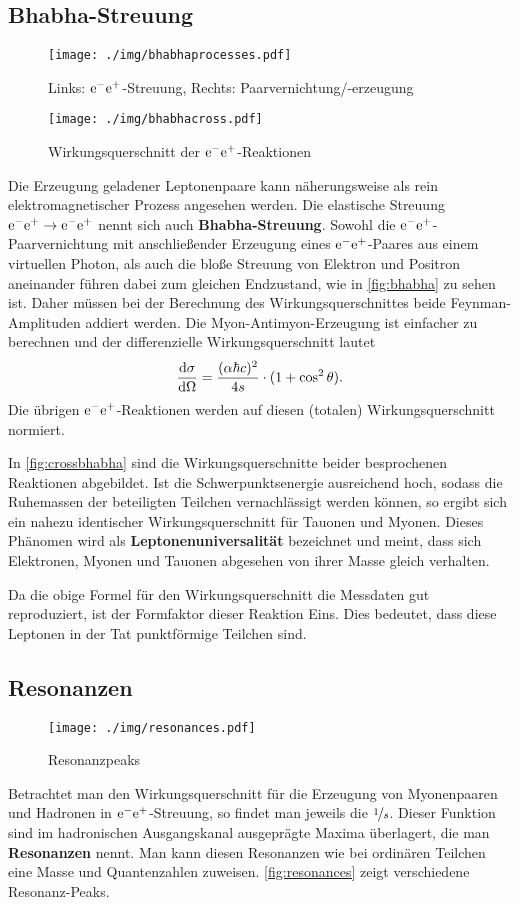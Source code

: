 \subsection{Bhabha-Streuung}
\begin{figure}
	\centering
	\texttt{[image: ./img/bhabhaprocesses.pdf]}
	\caption{Links: $\el\pos$-Streuung, Rechts: Paarvernichtung/-erzeugung}
	\label{fig:bhabha}
\end{figure}
\begin{figure}
	\centering
	\texttt{[image: ./img/bhabhacross.pdf]}
	\caption{Wirkungsquerschnitt der $\el\pos$-Reaktionen}
	\label{fig:crossbhabha}
\end{figure}
Die Erzeugung geladener Leptonenpaare kann näherungsweise als rein elektromagnetischer Prozess angesehen werden.
Die elastische Streuung $\el\pos\rightarrow\el\pos$ nennt sich auch \textbf{Bhabha-Streuung}.
Sowohl die $\el\pos$-Paarvernichtung mit anschließender Erzeugung eines $\el\pos$-Paares aus einem virtuellen Photon, als auch die bloße Streuung von Elektron und Positron aneinander führen dabei zum gleichen Endzustand, wie in \autoref{fig:bhabha} zu sehen ist.
Daher müssen bei der Berechnung des Wirkungsquerschnittes beide Feynman-Amplituden addiert werden.
Die Myon-Antimyon-Erzeugung ist einfacher zu berechnen und der differenzielle Wirkungsquerschnitt lautet
\begin{equation*}
	\diff[\sigma]{\Omega} = \frac{(\alpha\hbar c)^2}{4s}\cdot(1+\cos^2\theta).
\end{equation*}
Die übrigen $\el\pos$-Reaktionen werden auf diesen (totalen) Wirkungsquerschnitt normiert.

In \autoref{fig:crossbhabha} sind die Wirkungsquerschnitte beider besprochenen Reaktionen abgebildet.
Ist die Schwerpunktsenergie ausreichend hoch, sodass die Ruhemassen der beteiligten Teilchen vernachlässigt werden können, so ergibt sich ein nahezu identischer Wirkungsquerschnitt für Tauonen und Myonen.
Dieses Phänomen wird als \textbf{Leptonenuniversalität} bezeichnet und meint, dass sich Elektronen, Myonen und Tauonen abgesehen von ihrer Masse gleich verhalten.

Da die obige Formel für den Wirkungsquerschnitt die Messdaten gut reproduziert, ist der Formfaktor dieser Reaktion Eins.
Dies bedeutet, dass diese Leptonen in der Tat punktförmige Teilchen sind.

\subsection{Resonanzen}
\begin{figure}
	\centering
	\texttt{[image: ./img/resonances.pdf]}
	\caption{Resonanzpeaks}
	\label{fig:resonances}
\end{figure}
Betrachtet man den Wirkungsquerschnitt für die Erzeugung von Myonenpaaren und Hadronen in $\el\pos$-Streuung, so findet man jeweils die $\nicefrac{1}{s}$.
Dieser Funktion sind im hadronischen Ausgangskanal ausgeprägte Maxima überlagert, die man \textbf{Resonanzen} nennt.
Man kann diesen Resonanzen wie bei ordinären Teilchen eine Masse und Quantenzahlen zuweisen.
\autoref{fig:resonances} zeigt verschiedene Resonanz-Peaks.

